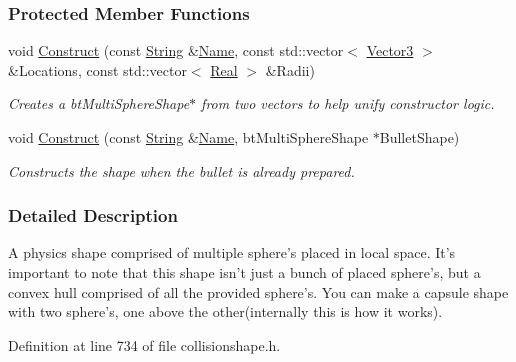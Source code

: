 \subsubsection*{Protected Member Functions}
\begin{DoxyCompactItemize}
\item 
void \hyperlink{classMezzanine_1_1MultiSphereCollisionShape_ad957ea7329c1516d64eedbb867d14d6e}{Construct} (const \hyperlink{namespaceMezzanine_acf9fcc130e6ebf08e3d8491aebcf1c86}{String} \&\hyperlink{classMezzanine_1_1CollisionShape_aac524c5c56fa4d158bc071f8aecfbe79}{Name}, const std::vector$<$ \hyperlink{classMezzanine_1_1Vector3}{Vector3} $>$ \&Locations, const std::vector$<$ \hyperlink{namespaceMezzanine_a726731b1a7df72bf3583e4a97282c6f6}{Real} $>$ \&Radii)
\begin{DoxyCompactList}\small\item\em Creates a btMultiSphereShape$\ast$ from two vectors to help unify constructor logic. \item\end{DoxyCompactList}\item 
void \hyperlink{classMezzanine_1_1MultiSphereCollisionShape_ab8d05e13b83063e0fac129b1c7dfea73}{Construct} (const \hyperlink{namespaceMezzanine_acf9fcc130e6ebf08e3d8491aebcf1c86}{String} \&\hyperlink{classMezzanine_1_1CollisionShape_aac524c5c56fa4d158bc071f8aecfbe79}{Name}, btMultiSphereShape $\ast$BulletShape)
\begin{DoxyCompactList}\small\item\em Constructs the shape when the bullet is already prepared. \item\end{DoxyCompactList}\end{DoxyCompactItemize}


\subsubsection{Detailed Description}
A physics shape comprised of multiple sphere's placed in local space. It's important to note that this shape isn't just a bunch of placed sphere's, but a convex hull comprised of all the provided sphere's. You can make a capsule shape with two sphere's, one above the other(internally this is how it works). 

Definition at line 734 of file collisionshape.h.



